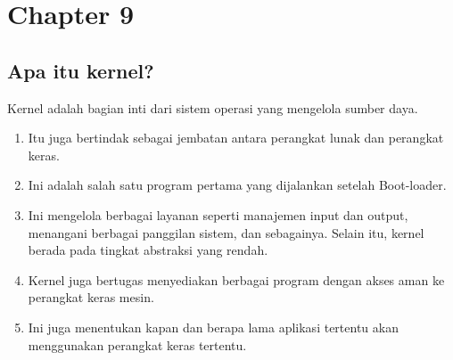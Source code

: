 

%
			
	
	
	\chapter{Chapter 9}
	\section{Apa itu kernel?}
	
	Kernel adalah bagian inti dari sistem operasi yang mengelola sumber daya. 
	
	\begin{enumerate}
	
	\item Itu juga bertindak sebagai jembatan antara perangkat lunak dan perangkat keras. 
	
	\item Ini adalah salah satu program pertama yang dijalankan setelah Boot-loader.
	
	\item Ini mengelola berbagai layanan seperti manajemen input dan output, menangani berbagai panggilan sistem, dan sebagainya. Selain itu, kernel berada pada tingkat abstraksi yang rendah.
	
	\item Kernel juga bertugas menyediakan berbagai program dengan akses aman ke perangkat keras mesin. 
	
	\item Ini juga menentukan kapan dan berapa lama aplikasi tertentu akan menggunakan perangkat keras tertentu.
	
	\end{enumerate}	


